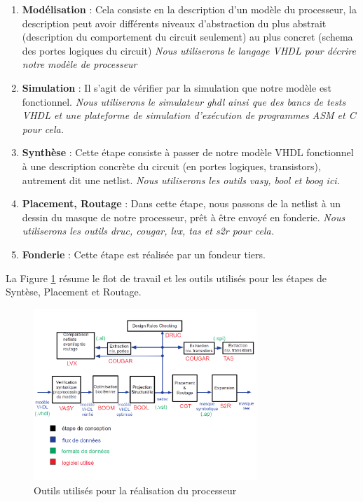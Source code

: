 \documentclass{article}
\begin{document}
\begin{enumerate}
\item \textbf{Modélisation}  : Cela consiste en la description d'un modèle du processeur,
                      la description peut avoir différents niveaux d'abstraction
                      du plus abstrait (description du comportement du circuit seulement)
                      au plus concret (schema des portes logiques du circuit)
                      \textit{Nous utiliserons le langage VHDL pour décrire notre modèle de processeur}
\item \textbf{Simulation}    : Il s'agit de vérifier par la simulation que notre modèle est fonctionnel.
                      \textit{Nous utiliserons le simulateur ghdl ainsi que des bancs de tests VHDL
                      et une plateforme de simulation d'exécution de programmes ASM et C pour cela.}
\item \textbf{Synthèse} : Cette étape consiste à passer de notre modèle VHDL fonctionnel à une description
                          concrète du circuit (en portes logiques, transistors), autrement dit une netlist.
                          \textit{Nous utiliserons les outils vasy, bool et boog ici.}
\item \textbf{Placement, Routage} : Dans cette étape, nous passons de la netlist à un
                          dessin du masque de notre processeur, prêt à être envoyé en fonderie.
                          \textit{Nous utiliserons les outils druc, cougar, lvx, tas et s2r pour cela.}
\item \textbf{Fonderie} :          Cette étape est réalisée par un fondeur tiers.
\end{enumerate}

La Figure \ref{outils} résume le flot de travail et les outils utilisés pour les étapes de Syntèse,
Placement et Routage.

\begin{figure}[H]
\includegraphics[width=0.75\textwidth]{pics/conception2.png}
\centering
\caption{Outils utilisés pour la réalisation du processeur}
\label{outils}
\end{figure}
\end{document}
